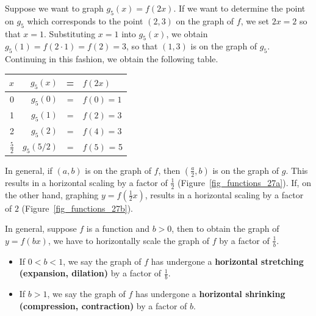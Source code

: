 Suppose we want to graph $g_5(x) = f(2x)$.   If we want to determine the point on $g_5$ which corresponds to the point $(2,3)$ on the graph of $f$,  we set $2x =2 $ so that $x=1$.  Substituting $x=1$ into $g_5(x)$, we obtain $g_5(1) = f(2 \cdot 1) = f(2) = 3$, so that $(1,3)$ is on the graph of $g_5$. Continuing in this fashion, we obtain the following table.   

\begin{center}
\begin{tabular}{r|rcl}  
$x$ & $g_5(x)$&=&$f(2x)$  \\ \hline\hline
0 & $g_5(0)$&=&$f(0) = 1$   \\  
1  &  $g_5(1)$&=&$f(2) = 3$   \\  
2   & $g_5(2)$&=&$f(4) = 3$ \\  
$\frac{5}{2}$  & $g_5(5/2)$&=&$f(5)$ = 5   
\end{tabular} 
\end{center}



In general, if $(a,b)$ is on the graph of $f$, then $\left(\frac{a}{2}, b\right)$ is on the graph of $g$.  This results in a horizontal scaling by a factor of $\frac{1}{2}$ (Figure~\ref{fig_functions_27a}). If, on the other hand, graphing $y = f\left( \frac{1}{2} x\right)$, results in a horizontal scaling by a factor of $2$ (Figure~\ref{fig_functions_27b}).







In general, suppose $f$ is a function and $b>0$, then to obtain the  graph of $y= f(bx)$, we have to horizontally scale the graph of $f$ by a factor of $\frac{1}{b}$. 

\begin{itemize}

\item If $0 < b < 1$, we say the graph of $f$ has undergone a \textbf{horizontal stretching (expansion, dilation)} by a factor of $\frac{1}{b}$. 
\item If $b>1$, we say the graph of $f$ has undergone a \textbf{horizontal shrinking (compression, contraction)} by a factor of $b$.
\end{itemize}

